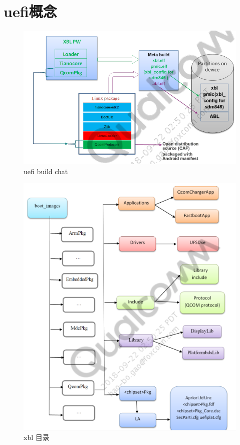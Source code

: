 \chapter{uefi概念}







\begin{figure}[htbp]
\begin{center}
\includegraphics[width=15cm]{img/uefimeta}
\caption{uefi build chat}
\label{howxblmade}
\end{center}
\vspace{-0.5em}
\end{figure}



\begin{figure}
\begin{center}
\includegraphics[width=13cm]{img/xbldir}
\caption{xbl 目录}
\label{xbldir}
\end{center}
\vspace{-0.5em}
\end{figure}



